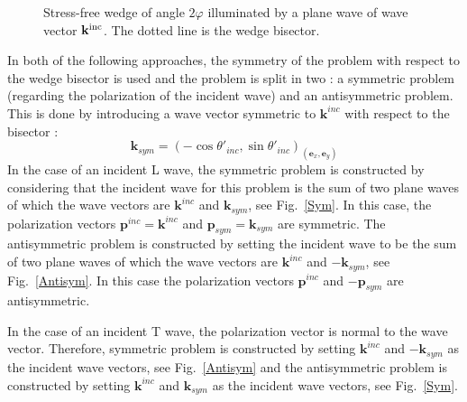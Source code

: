 \begin{figure}
\caption{Stress-free wedge of angle $2\varphi$ illuminated by a plane wave of wave vector $\mathbf{k}^{\rm inc}$. The dotted line is the wedge bisector.}
\label{C1:wedge}
\end{figure}

In both of the following approaches, the symmetry of the problem with respect to the wedge bisector is used and the problem is split in two : a symmetric problem (regarding the polarization of the incident wave) and an antisymmetric problem. This is done by introducing a wave vector symmetric to $\mathbf{k}^{inc}$ with respect to the bisector :
\begin{equation}
\mathbf{k}_{sym}=(-\cos\theta'_{inc},\sin\theta'_{inc})_{(\mathbf{e}_x,\mathbf{e}_y)}
\end{equation}
In the case of an incident L wave, the symmetric problem is constructed by considering that the incident wave for this problem is the sum of two plane waves of which the wave vectors are $\mathbf{k}^{inc}$ and $\mathbf{k}_{sym}$, see Fig.~\ref{Sym}. In this case, the polarization vectors $\mathbf{p}^{inc}=\mathbf{k}^{inc}$ and $\mathbf{p}_{sym}=\mathbf{k}_{sym}$ are symmetric. The antisymmetric problem is constructed by setting the incident wave to be the sum of two plane waves of which the wave vectors are $\mathbf{k}^{inc}$ and $-\mathbf{k}_{sym}$, see Fig.~\ref{Antisym}. In this case the polarization vectors $\mathbf{p}^{inc}$ and $-\mathbf{p}_{sym}$ are antisymmetric.

In the case of an incident T wave, the polarization vector is normal to the wave vector. Therefore, symmetric problem is constructed by setting $\mathbf{k}^{inc}$ and $-\mathbf{k}_{sym}$ as the incident wave vectors, see Fig.~\ref{Antisym} and the antisymmetric problem is constructed by setting $\mathbf{k}^{inc}$ and $\mathbf{k}_{sym}$ as the incident wave vectors, see Fig.~\ref{Sym}.

